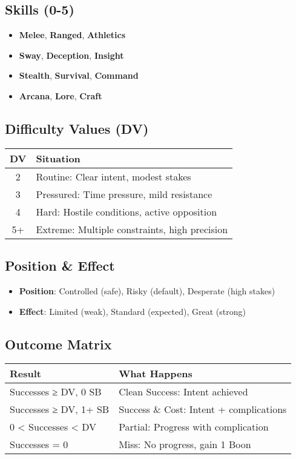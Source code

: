 \documentclass[11pt]{article}
\begin{document}
\subsection{Skills (0-5)}
\begin{itemize}
    \item \textbf{Melee}, \textbf{Ranged}, \textbf{Athletics}
    \item \textbf{Sway}, \textbf{Deception}, \textbf{Insight}
    \item \textbf{Stealth}, \textbf{Survival}, \textbf{Command}
    \item \textbf{Arcana}, \textbf{Lore}, \textbf{Craft}
\end{itemize}

\subsection{Difficulty Values (DV)}
\begin{center}
\begin{tabular}{cl}
\toprule
\textbf{DV} & \textbf{Situation} \\
\midrule
2 & Routine: Clear intent, modest stakes \\
3 & Pressured: Time pressure, mild resistance \\
4 & Hard: Hostile conditions, active opposition \\
5+ & Extreme: Multiple constraints, high precision \\
\bottomrule
\end{tabular}
\end{center}

\subsection{Position \& Effect}
\begin{itemize}
    \item \textbf{Position}: Controlled (safe), Risky (default), Desperate (high stakes)
    \item \textbf{Effect}: Limited (weak), Standard (expected), Great (strong)
\end{itemize}

\subsection{Outcome Matrix}
\begin{center}
\begin{tabular}{ll}
\toprule
\textbf{Result} & \textbf{What Happens} \\
\midrule
Successes ≥ DV, 0 SB & Clean Success: Intent achieved \\
Successes ≥ DV, 1+ SB & Success \& Cost: Intent + complications \\
0 < Successes < DV & Partial: Progress with complication \\
Successes = 0 & Miss: No progress, gain 1 Boon \\
\bottomrule
\end{tabular}
\end{center}
\end{document}
